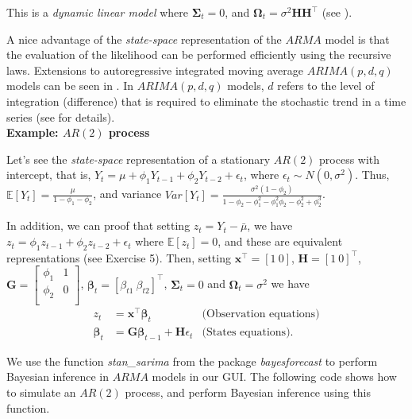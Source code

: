 This is a \textit{dynamic linear model} where $\bm{\Sigma}_t=0$, and $\bm{\Omega}_t=\sigma^2\bm{H}\bm{H}^{\top}$ (see \cite{petris2009dynamic,chib1994bayes}).

A nice advantage of the \textit{state-space} representation of the $ARMA$ model is that the evaluation of the likelihood can be performed efficiently using the recursive laws. Extensions to autoregressive integrated moving average $ARIMA(p,d,q)$ models can be seen in \cite[Chap.~3]{petris2009dynamic}. In $ARIMA(p,d,q)$ models, $d$ refers to the level of integration (difference) that is required to eliminate the stochastic trend in a time series (see \cite[Chap.~4]{enders_2014} for details).\\

\textbf{Example: $AR(2)$ process}

Let's see the \textit{state-space} representation of a stationary $AR(2)$ process with intercept, that is, $Y_t=\mu+\phi_1Y_{t-1}+\phi_2Y_{t-2}+\epsilon_t$, where $\epsilon_t\sim N(0,\sigma^2)$. Thus, $\mathbb{E}[Y_t]=\frac{\mu}{1-\phi_1-\phi_2}$, and variance $Var[Y_t]=\frac{\sigma^2(1-\phi_2)}{1-\phi_2-\phi_1^2-\phi_1^2\phi_2-\phi_2^2+\phi_2^3}$.

In addition, we can proof that setting $z_t=Y_t-\bar{\mu}$, we have $z_t=\phi_1z_{t-1}+\phi_2z_{t-2}+\epsilon_t$ where $\mathbb{E}[z_t]=0$, and these are equivalent representations (see Exercise 5). Then, setting  $\bm{x}^{\top}=[1 \ 0]$, $\bm{H}=[1 \ 0]^{\top}$, $\bm{G}=\begin{bmatrix}
	\phi_1 & 1\\
	\phi_2 & 0 \\
\end{bmatrix}$, $\bm{\beta}_t=[\beta_{t1} \ \beta_{t2}]^{\top}$, $\bm{\Sigma}_t=0$ and $\bm{\Omega}_t=\sigma^2$ we have
\begin{align*}
	z_t&=\bm{x}^{\top}\bm{\beta}_t& \text{(Observation equations)}\\
	\bm{\beta}_t&=\bm{G}\bm{\beta}_{t-1}+\bm{H}{\epsilon}_t & \text{(States equations)}.
\end{align*}

We use the function \textit{stan\_sarima} from the package \textit{bayesforecast} to perform Bayesian inference in $ARMA$ models in our GUI. The following code shows how to simulate an $AR(2)$ process, and perform Bayesian inference using this function.

